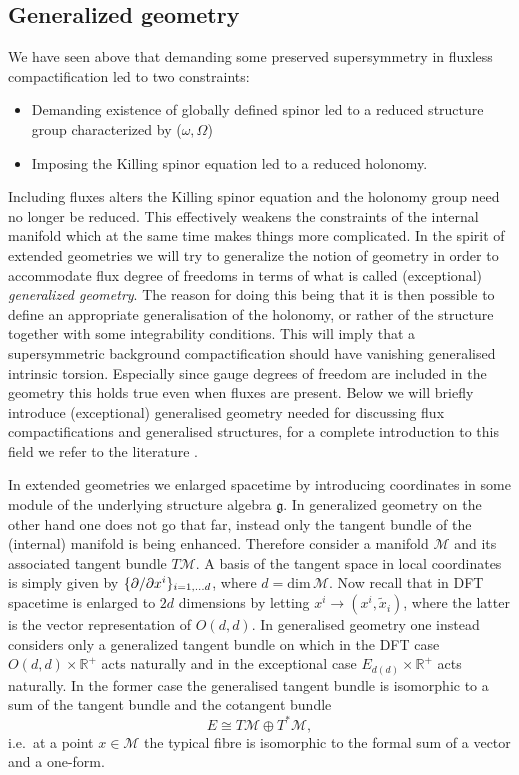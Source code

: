 \subsection{Generalized geometry}
We have seen above that demanding some preserved supersymmetry in fluxless compactification led to two constraints:
\begin{itemize}
    \item Demanding existence of globally defined spinor led to a reduced structure group characterized by ($\omega,\Omega$)
    \item Imposing the Killing spinor equation led to a reduced holonomy. 
\end{itemize}
Including fluxes alters the Killing spinor equation and the holonomy group need no longer be reduced. This effectively weakens the constraints of the internal manifold which at the same time makes things more complicated. In the spirit of extended geometries we will try to generalize the notion of geometry in order to accommodate flux degree of freedoms in terms of what is called (exceptional) \emph{generalized geometry}. The reason for doing this being that it is then possible to define an appropriate generalisation of the holonomy, or rather of the structure together with some integrability conditions. This will imply that a supersymmetric background compactification should have vanishing generalised intrinsic torsion. Especially since gauge degrees of freedom are included in the geometry this holds true even when fluxes are present. Below we will briefly introduce (exceptional) generalised geometry needed for discussing flux compactifications and generalised structures, for a complete introduction to this field we refer to the literature \cite{Hull:2007zu,Coimbra:2011nw,Coimbra:2011ky,Ntokos:2016vnm}.

In extended geometries we enlarged spacetime by introducing coordinates in some module of the underlying structure algebra $\mathfrak{g}$. In generalized geometry on the other hand one does not go that far, instead only the tangent bundle of the (internal) manifold is being enhanced.  Therefore consider a manifold $\mathcal{M}$ and its associated tangent bundle $T\mathcal{M}$. A basis of the tangent space in local coordinates is simply given by $\{\partial/\partial x^i\}_{i=1,\ldots d}$, where $d=\text{dim}\,\mathcal{M}$. Now recall that in DFT spacetime is enlarged to $2d$ dimensions by letting $x^i\to (x^i,\tilde{x}_i)$, where the latter is the vector representation of $O(d,d)$. In generalised geometry one instead considers only a generalized tangent bundle on which in the DFT case $O(d,d)\times \mathbb{R}^+$ acts naturally and in the exceptional case $E_{d(d)}\times\mathbb{R}^+$ acts naturally.  In the former case the generalised tangent bundle is isomorphic to a sum of the tangent bundle and the cotangent bundle
\begin{equation}\label{eq:GenTangentBundleDef}
E \cong T\mathcal{M}\oplus T^*\mathcal{M},
\end{equation}
i.e.\ at a point $x\in\mathcal{M}$ the typical fibre is isomorphic to the formal sum of a vector and a one-form. 

